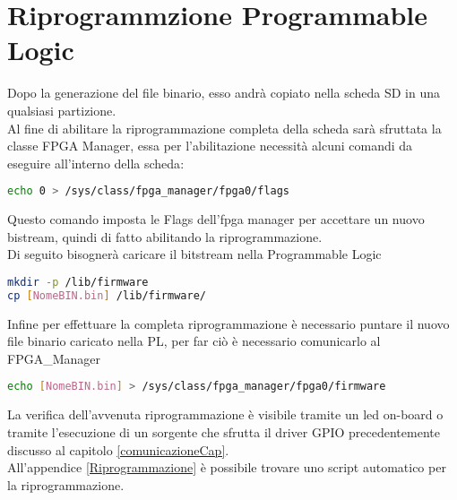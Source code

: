 \section{Riprogrammzione Programmable Logic}
Dopo la generazione del file binario, esso andrà copiato nella scheda SD in una qualsiasi partizione.\\
Al fine di abilitare la riprogrammazione completa della scheda sarà sfruttata la classe FPGA Manager, essa per l'abilitazione necessità alcuni comandi da eseguire all'interno della scheda\cite{PL}:
\begin{lstlisting}[language=sh, label=lst:C, caption={Abilitazione FPGA\_manager}]
echo 0 > /sys/class/fpga_manager/fpga0/flags
\end{lstlisting}
Questo comando imposta le Flags dell'fpga manager per accettare un nuovo bistream, quindi di fatto abilitando la riprogrammazione.\\
Di seguito bisognerà caricare il bitstream nella Programmable Logic
\begin{lstlisting}[language=sh, label=lst:C, caption={Caricamento bitstream nella Programmable Logic}]
mkdir -p /lib/firmware
cp [NomeBIN.bin] /lib/firmware/
\end{lstlisting}
Infine per effettuare la completa riprogrammazione è necessario puntare il nuovo file binario caricato nella PL, per far ciò è necessario comunicarlo al FPGA\_Manager
\begin{lstlisting}[language=sh, label=lst:C, caption={Comunicazione nuovo bitstream alla PL}]
echo [NomeBIN.bin] > /sys/class/fpga_manager/fpga0/firmware
\end{lstlisting}
La verifica dell'avvenuta riprogrammazione è visibile tramite un led on-board o tramite l'esecuzione di un sorgente che sfrutta il driver GPIO precedentemente discusso al capitolo \ref{comunicazioneCap}.\\
All'appendice \ref{Riprogrammazione} è possibile trovare uno script automatico per la riprogrammazione.